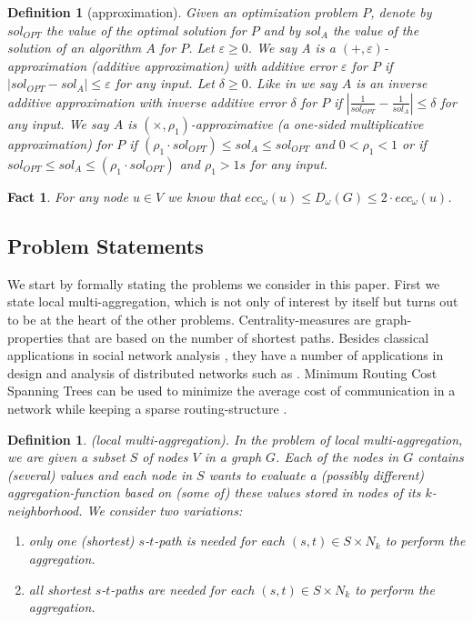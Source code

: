 \documentclass[11pt]{article}
\newtheorem{definition}[theorem]{Definition}
\newtheorem{fact}[theorem]{Fact}
\renewcommand{\epsilon}{\varepsilon}
\newif\iffull
\begin{document}
\begin{definition}[approximation] 
Given an optimization problem $P$, denote by $sol_{OPT}$ the value of the optimal solution for $P$ and by $sol_A$ the value of the solution of an algorithm $A$ for $P$.
Let $\epsilon\geq 0$. We say A is a $(+,\epsilon)$-approximation (additive approximation) with additive error $\epsilon$ for $P$ if $|sol_{OPT}-sol_A|\leq\epsilon$ for any input.
Let $\delta\geq 0$. Like in \cite{eppstein:2001:fastCCapprox} we say $A$ is an inverse additive approximation with inverse additive error $\delta$ for $P$ if $\left|\frac{1}{sol_{OPT}}-\frac{1}{sol_A}\right|\leq\delta$ for any input. 
We say $A$ is $\left(\times ,\rho_1\right)$-approximative (a one-sided multiplicative approximation) for $P$ if $(\rho_1\cdot sol_{OPT})\le sol_A \le sol_{OPT}$ and $0<\rho_1<1$ or if $sol_{OPT}\le sol_A \le (\rho_1\cdot sol_{OPT})$ and $\rho_1>1s$ for any input.
\end{definition}
\iffull
Like in \cite{eppstein:2001:fastCCapprox}, the inverse additive error is used in the closeness centrality approximation, see Section \ref{sec:CC}.
\fi
\begin{fact}\label{fact:ecc-approx-diam}
 For any node $u\in V$ we know that $ecc_{\omega}\left(u\right)\leq D_{\omega}\left(G\right) \leq 2\cdot ecc_{\omega}\left(u\right)$.\end{fact}


\subsection{Problem Statements}
We start by formally stating the problems we consider in this paper. First we state local multi-aggregation, which is not only of interest by itself but turns out to be at the heart of the other problems. Centrality-measures are graph-properties that are based on the number of shortest paths. Besides classical applications in social network analysis \cite{carrington2005models,wasserman1994social}, they have a number of applications in design and analysis of distributed networks such as \cite{aggarwal2010survey,borgatti2005centrality,daly2007social}. Minimum Routing Cost Spanning Trees can be used to minimize the average cost of communication in a network while keeping a sparse routing-structure \cite{hu1974optimum,wong1980worst}. 
 \begin{definition}(local multi-aggregation).
In the problem of local multi-aggregation, we are given a subset $S$ of nodes $V$ in a graph $G$. Each of the nodes in $G$ contains (several) values and each node in $S$ wants to evaluate a (possibly different) aggregation-function based on (some of) these values stored in nodes of its $k$-neighborhood.
We consider two variations:
\begin{enumerate}
\item only one (shortest) $s$-$t$-path is needed for each $(s,t)\in S\times N_k$ to perform the aggregation.
\item all shortest $s$-$t$-paths are needed for each $(s,t)\in S\times N_k$ to perform the aggregation.
\end{enumerate}\end{definition}
\end{document}
